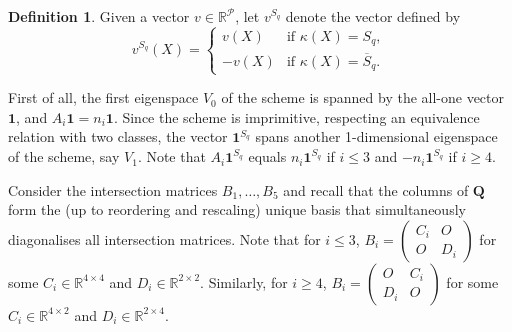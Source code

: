 \documentclass[a4paper]{article}
\theoremstyle{definition}
\newtheorem{df}[thm]{Definition}
\newcommand{\RR}{\mathbb R}
\newcommand{\one}{\mathbf 1}
\newcommand{\pp}{\mathcal P}
\newcommand{\ns}{\overline S}
\begin{document}
\begin{df}
 Given a vector $v \in \RR^\pp$, let $v^{S_q}$ denote the vector defined by
 \[
  v^{S_q} (X) = \begin{cases}
   v(X) & \text{if } \kappa(X) = S_q, \\
   -v(X) & \text{if } \kappa(X) = \ns_q.
  \end{cases}
 \]
\end{df}

First of all, the first eigenspace $V_0$ of the scheme is spanned by the all-one vector $\one$, and $A_i \one = n_i \one$.
Since the scheme is imprimitive, respecting an equivalence relation with two classes, the vector $\one^{S_q}$ spans another 1-dimensional eigenspace of the scheme, say $V_1$.
Note that $A_i \one^{S_q}$ equals $n_i \one^{S_q}$ if $i \leq 3$ and $-n_i \one^{S_q}$ if $i \geq 4$.

Consider the intersection matrices $B_1, \dots, B_5$ and recall that the columns of $\mathbf Q$ form the (up to reordering and rescaling) unique basis that simultaneously diagonalises all intersection matrices.
Note that for $i \leq 3$,
\(
 B_i = \begin{pmatrix}
  C_i & O \\ O & D_i
 \end{pmatrix}
\)
for some $C_i \in \RR^{4\times 4}$ and $D_i \in \RR^{2\times 2}$.
Similarly, for $i \geq 4$,
\(
 B_i = \begin{pmatrix}
  O & C_i \\ D_i & O
 \end{pmatrix}
\)
for some $C_i \in \RR^{4 \times 2}$ and $D_i \in \RR^{2 \times 4}$.
\end{document}
